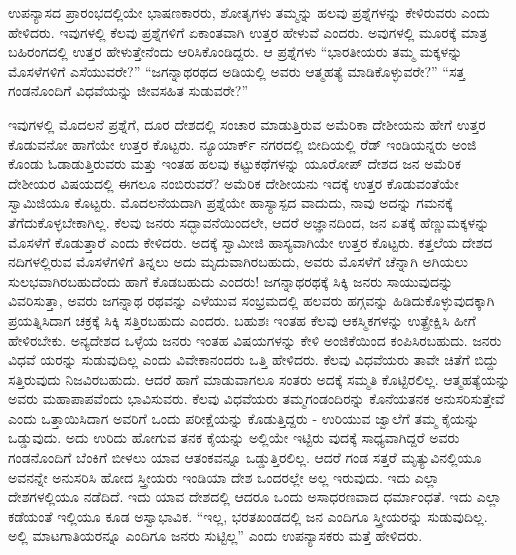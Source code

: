 ಉಪನ್ಯಾಸದ ಪ್ರಾರಂಭದಲ್ಲಿಯೇ ಭಾಷಣಕಾರರು, ಶೋತೃಗಳು ತಮ್ಮನ್ನು ಹಲವು ಪ್ರಶ್ನೆಗಳನ್ನು ಕೇಳಿರುವರು ಎಂದು ಹೇಳಿದರು. ಇವುಗಳಲ್ಲಿ ಕೆಲವು ಪ್ರಶ್ನೆಗಳಿಗೆ ಏಕಾಂತವಾಗಿ ಉತ್ತರ ಹೇಳುವೆ ಎಂದರು. ಅವುಗಳಲ್ಲಿ ಮೂರಕ್ಕೆ ಮಾತ್ರ ಬಹಿರಂಗದಲ್ಲಿ ಉತ್ತರ ಹೇಳುತ್ತೇನೆಂದು ಆರಿಸಿಕೊಂಡಿದ್ದರು. ಆ ಪ್ರಶ್ನೆಗಳು “ಭಾರತೀಯರು ತಮ್ಮ ಮಕ್ಕಳನ್ನು ಮೊಸಳೆಗಳಿಗೆ ಎಸೆಯುವರೇ?” “ಜಗನ್ನಾಥರಥದ ಅಡಿಯಲ್ಲಿ ಅವರು ಆತ್ಮಹತ್ಯೆ ಮಾಡಿಕೊಳ್ಳುವರೇ?” “ಸತ್ತ ಗಂಡನೊಂದಿಗೆ ವಿಧವೆಯನ್ನು ಜೀವಸಹಿತ ಸುಡುವರೇ?”

ಇವುಗಳಲ್ಲಿ ಮೊದಲನೆ ಪ್ರಶ್ನೆಗೆ, ದೂರ ದೇಶದಲ್ಲಿ ಸಂಚಾರ ಮಾಡುತ್ತಿರುವ ಅಮೆರಿಕಾ ದೇಶೀಯನು ಹೇಗೆ ಉತ್ತರ ಕೊಡುವನೋ ಹಾಗೆಯೇ ಉತ್ತರ ಕೊಟ್ಟರು. ನ್ಯೂಯಾರ್ಕ್​ ನಗರದಲ್ಲಿ ಬೀದಿಯಲ್ಲಿ ರೆಡ್​ ಇಂಡಿಯನ್ನರು ಅಂಜಿ ಕೊಂಡು ಓಡಾಡುತ್ತಿರುವರು ಮತ್ತು ಇಂತಹ ಹಲವು ಕಟ್ಟುಕಥೆಗಳನ್ನು ಯೂರೋಪ್​ ದೇಶದ ಜನ ಅಮೆರಿಕ ದೇಶೀಯರ ವಿಷಯದಲ್ಲಿ ಈಗಲೂ ನಂಬಿರುವರೆ? ಅಮೆರಿಕ ದೇಶೀಯನು ಇದಕ್ಕೆ ಉತ್ತರ ಕೊಡುವಂತೆಯೇ ಸ್ವಾಮಿಜಿಯೂ ಕೊಟ್ಟರು. ಮೊದಲನೆಯದಾಗಿ ಪ್ರಶ್ನೆಯೇ ಹಾಸ್ಯಾಸ್ಪದ ವಾದುದು, ನಾವು ಅದನ್ನು ಗಮನಕ್ಕೆ ತೆಗೆದುಕೊಳ್ಳಬೇಕಾಗಿಲ್ಲ. ಕೆಲವು ಜನರು ಸದ್ಭಾವನೆಯಿಂದಲೇ, ಆದರೆ ಅಜ್ಞಾನದಿಂದ, ಜನ ಏತಕ್ಕೆ ಹೆಣ್ಣುಮಕ್ಕಳನ್ನು ಮೊಸಳೆಗೆ ಕೊಡುತ್ತಾರೆ ಎಂದು ಕೇಳಿದರು. ಅದಕ್ಕೆ ಸ್ವಾಮೀಜಿ ಹಾಸ್ಯವಾಗಿಯೇ ಉತ್ತರ ಕೊಟ್ಟರು. ಕತ್ತಲೆಯ ದೇಶದ ನದಿಗಳಲ್ಲಿರುವ ಮೊಸಳೆಗಳಿಗೆ ತಿನ್ನಲು ಅದು ಮೃದುವಾಗಿರಬಹುದು, ಅವರು ಮೊಸಳೆಗೆ ಚೆನ್ನಾಗಿ ಅಗಿಯಲು ಸುಲಭವಾಗಿರಬಹುದೆಂದು ಹಾಗೆ ಕೊಡಬಹುದು ಎಂದರು! ಜಗನ್ನಾಥರಥಕ್ಕೆ ಸಿಕ್ಕಿ ಜನರು ಸಾಯುವುದನ್ನು ವಿವರಿಸುತ್ತಾ, ಅವರು ಜಗನ್ನಾಥ ರಥವನ್ನು ಎಳೆಯುವ ಸಂಭ್ರಮದಲ್ಲಿ ಹಲವರು ಹಗ್ಗವನ್ನು ಹಿಡಿದುಕೊಳ್ಳುವುದಕ್ಕಾಗಿ ಪ್ರಯತ್ನಿಸಿದಾಗ ಚಕ್ರಕ್ಕೆ ಸಿಕ್ಕಿ ಸತ್ತಿರಬಹುದು ಎಂದರು. ಬಹುಶಃ ಇಂತಹ ಕೆಲವು ಆಕಸ್ಮಿಕಗಳನ್ನು ಉತ್ಪ್ರೇಕ್ಷಿಸಿ ಹೀಗೆ ಹೇಳಿರಬೇಕು. ಅನ್ಯದೇಶದ ಒಳ್ಳೆಯ ಜನರು ಇಂತಹ ವಿಷಯಗಳನ್ನು ಕೇಳಿ ಅಂಜಿಕೆಯಿಂದ ಕಂಪಿಸಿರಬಹುದು. ಜನರು ವಿಧವೆ ಯರನ್ನು ಸುಡುವುದಿಲ್ಲ ಎಂದು ವಿವೇಕಾನಂದರು ಒತ್ತಿ ಹೇಳಿದರು. ಕೆಲವು ವಿಧವೆಯರು ತಾವೇ ಚಿತೆಗೆ ಬಿದ್ದು ಸತ್ತಿರುವುದು ನಿಜವಿರಬಹುದು. ಆದರೆ ಹಾಗೆ ಮಾಡುವಾಗಲೂ ಸಂತರು ಅದಕ್ಕೆ ಸಮ್ಮತಿ ಕೊಟ್ಟಿರಲಿಲ್ಲ. ಆತ್ಮಹತ್ಯೆಯನ್ನು ಅವರು ಮಹಾಪಾಪವೆಂದು ಭಾವಿಸುವರು. ಕೆಲವು ವಿಧವೆಯರು ತಮ್ಮಗಂಡಂದಿರನ್ನು ಕೊನೆಯತನಕ ಅನುಸರಿಸುತ್ತೇವೆ ಎಂದು ಒತ್ತಾಯಿಸಿದಾಗ ಅವರಿಗೆ ಒಂದು ಪರೀಕ್ಷೆಯನ್ನು ಕೊಡುತ್ತಿದ್ದರು - ಉರಿಯುವ ಜ್ವಾಲೆಗೆ ತಮ್ಮ ಕೈಯನ್ನು ಒಡ್ಡುವುದು. ಅದು ಉರಿದು ಹೋಗುವ ತನಕ ಕೈಯನ್ನು ಅಲ್ಲಿಯೇ ಇಟ್ಟಿರು ವುದಕ್ಕೆ ಸಾಧ್ಯವಾಗಿದ್ದರೆ ಅವರು ಗಂಡನೊಂದಿಗೆ ಬೆಂಕಿಗೆ ಬೀಳಲು ಯಾವ ಆತಂಕವನ್ನೂ ಒಡ್ಡುತ್ತಿರಲಿಲ್ಲ. ಆದರೆ ಗಂಡ ಸತ್ತರೆ ಮೃತ್ಯುವಿನಲ್ಲಿಯೂ ಅವನನ್ನೇ ಅನುಸರಿಸಿ ಹೋದ ಸ್ತ್ರೀಯರು ಇಂಡಿಯಾ ದೇಶ ಒಂದರಲ್ಲೇ ಅಲ್ಲ ಇರುವುದು. ಇದು ಎಲ್ಲಾ ದೇಶಗಳಲ್ಲಿಯೂ ನಡೆದಿದೆ. ಇದು ಯಾವ ದೇಶದಲ್ಲಿ ಆದರೂ ಒಂದು ಅಸಾಧರಣವಾದ ಧರ್ಮಾಂಧತೆ. ಇದು ಎಲ್ಲಾ ಕಡೆಯಂತೆ ಇಲ್ಲಿಯೂ ಕೂಡ ಅಸ್ವಾಭಾವಿಕ. “ಇಲ್ಲ, ಭರತಖಂಡದಲ್ಲಿ ಜನ ಎಂದಿಗೂ ಸ್ತ್ರೀಯರನ್ನು ಸುಡುವುದಿಲ್ಲ. ಅಲ್ಲಿ ಮಾಟಗಾತಿಯರನ್ನೂ ಎಂದಿಗೂ ಜನರು ಸುಟ್ಟಿಲ್ಲ” ಎಂದು ಉಪನ್ಯಾಸಕರು ಮತ್ತೆ ಹೇಳಿದರು.

